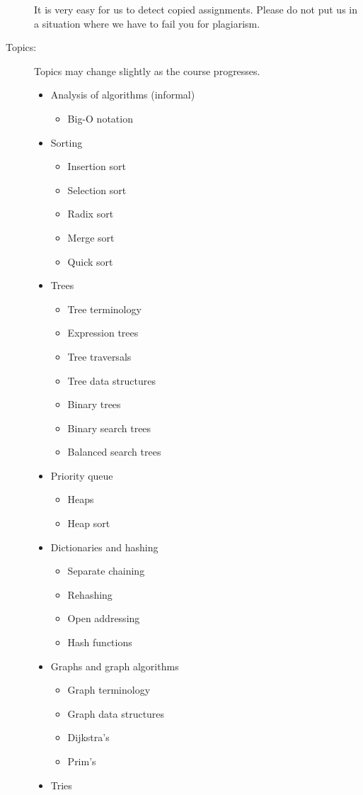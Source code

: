 \documentclass{article}
\begin{document}
\begin{description}
  It is very easy for us to detect copied assignments.  Please do not
  put us in a situation where we have to fail you for plagiarism.

\item[Topics:] Topics may change slightly as the course progresses.

  \begin{itemize}
  \item Analysis of algorithms (informal)
    \begin{itemize}
    \item Big-O notation
    \end{itemize}
  \item Sorting
    \begin{itemize}
    \item Insertion sort
    \item Selection sort
    \item Radix sort
    \item Merge sort
    \item Quick sort
    \end{itemize}
  \item Trees
    \begin{itemize}
    \item Tree terminology
    \item Expression trees
    \item Tree traversals
    \item Tree data structures
    \item Binary trees
    \item Binary search trees
    \item Balanced search trees
    \end{itemize}
  \item Priority queue
    \begin{itemize}
    \item Heaps
    \item Heap sort
    \end{itemize}
  \item Dictionaries and hashing
    \begin{itemize}
    \item Separate chaining
    \item Rehashing
    \item Open addressing
    \item Hash functions
    \end{itemize}
  \item Graphs and graph algorithms
    \begin{itemize}
    \item Graph terminology
    \item Graph data structures
    \item Dijkstra's 
    \item Prim's
    \end{itemize}
  \item Tries
  \end{itemize}
  
    


\end{description}
\end{document}
